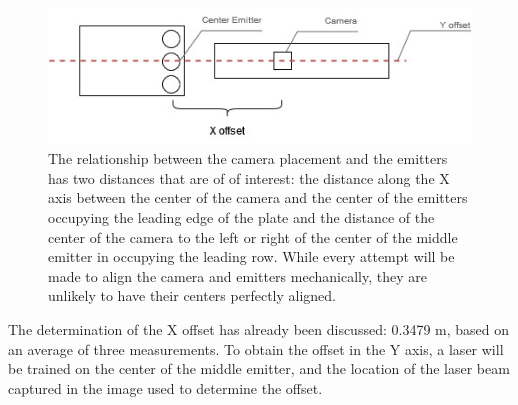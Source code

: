 \documentclass[12pt]{article}
\begin{document}
\begin{figure}[H]
	\centering
	\includegraphics[width=0.75\linewidth]{./figures/camera-to-emitter-relationship.jpg}
	\caption[Determine relationship between camera and emitter]{The relationship between the camera placement and the emitters has two distances that are of of interest: the distance along the X axis between the center of the camera and the center of the emitters occupying the leading edge of the plate and the distance of the center of the camera to the left or right of the center of the middle emitter in occupying the leading row. While every attempt will be made to align the camera and emitters mechanically, they are unlikely to have their centers perfectly aligned.}
	\label{fig:camera-to-emitter-relationship}
\end{figure}

The determination of the X offset has already been discussed: 0.3479 m, based on an average of three measurements. To obtain the offset in the Y  axis, a laser will be trained on the center of the middle emitter, and the location of the laser beam captured in the image used to determine the offset.
\end{document}
